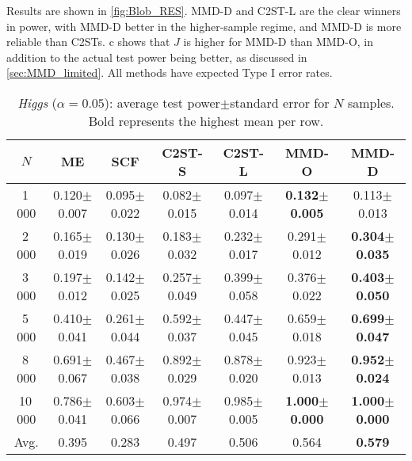 \documentclass{article}
\newcommand{\mnstd}[2]{#1{\scriptsize$\pm$#2}}
\begin{document}
Results are shown in \cref{fig:Blob_RES}.
MMD-D and C2ST-L are the clear winners in power,
with MMD-D better in the higher-sample regime, and MMD-D is more reliable than C2STs.
c shows that $J$ is higher for MMD-D than MMD-O,
in addition to the actual test power being better,
as discussed in \cref{sec:MMD_limited}.
All methods have expected Type I error rates.




\begin{table*}[ht]
\centering
  \footnotesize
  \caption{\emph{Higgs} ($\alpha=0.05$): average test power$\pm$standard error for $N$ samples. Bold represents the highest mean per row.} \label{tab:Higgs_RES1}
\vspace{1mm}
\begin{tabular}{c|cccccc}
\toprule
$N$ & ME & SCF & C2ST-S & C2ST-L &MMD-O & MMD-D \\
\midrule
\phantom{1}1$\,$000 & \mnstd{0.120}{0.007} & \mnstd{0.095}{0.022} & \mnstd{0.082}{0.015} & \mnstd{0.097}{0.014} & \mnstd{\bf 0.132}{0.005} & \mnstd{0.113}{0.013} \\
\phantom{1}2$\,$000 & \mnstd{0.165}{0.019} & \mnstd{0.130}{0.026} & \mnstd{0.183}{0.032} & \mnstd{0.232}{0.017} & \mnstd{0.291}{0.012} & \mnstd{\bf 0.304}{0.035} \\
\phantom{1}3$\,$000 & \mnstd{0.197}{0.012} & \mnstd{0.142}{0.025} & \mnstd{0.257}{0.049} & \mnstd{0.399}{0.058} & \mnstd{0.376}{0.022} & \mnstd{\bf 0.403}{0.050} \\
\phantom{1}5$\,$000 & \mnstd{0.410}{0.041} & \mnstd{0.261}{0.044} & \mnstd{0.592}{0.037} & \mnstd{0.447}{0.045} & \mnstd{0.659}{0.018} & \mnstd{\bf 0.699}{0.047} \\
\phantom{1}8$\,$000 & \mnstd{0.691}{0.067} & \mnstd{0.467}{0.038} & \mnstd{0.892}{0.029} & \mnstd{0.878}{0.020} & \mnstd{0.923}{0.013} & \mnstd{\bf 0.952}{0.024} \\
          10$\,$000 & \mnstd{0.786}{0.041} & \mnstd{0.603}{0.066} & \mnstd{0.974}{0.007} & \mnstd{0.985}{0.005} & \mnstd{\bf 1.000}{0.000} & \mnstd{\bf 1.000}{0.000} \\
\midrule
Avg. & 0.395 & 0.283 & 0.497 & 0.506 & 0.564 & {\bf 0.579} \\
\bottomrule
\end{tabular}
\vspace{-1em}
\end{table*}
\end{document}
